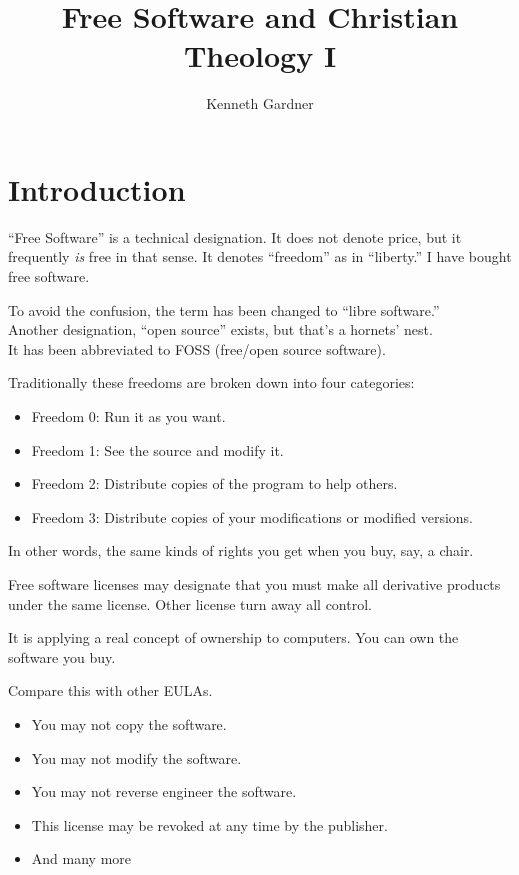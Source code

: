 \documentclass{beamer}
\title{Free Software and Christian Theology I}
\author{Kenneth Gardner}
\begin{document}
\maketitle

\section{Introduction}

\begin{frame}
  ``Free Software'' is a technical designation.
  It does not denote price, but it frequently \emph{is} free in that sense.
  It denotes ``freedom'' as in ``liberty.''
  I have bought free software.
\end{frame}

\begin{frame}
  To avoid the confusion, the term has been changed to ``libre software.''\\ \pause
  Another designation, ``open source'' exists, but that's a hornets' nest.\\ \pause
  It has been abbreviated to FOSS (free/open source software).
\end{frame}

\begin{frame}
  Traditionally these freedoms are broken down into four categories:\pause
  \begin{itemize}
	\item Freedom 0: Run it as you want.\pause
	\item Freedom 1: See the source and modify it.\pause
	\item Freedom 2: Distribute copies of the program to help others.\pause
	\item Freedom 3: Distribute copies of your modifications or modified versions.\pause
  \end{itemize}
  In other words, the same kinds of rights you get when you buy, say, a chair.
\end{frame}

\begin{frame}
  Free software licenses may designate that you must make all derivative products under the same license.
  Other license turn away all control.

  It is applying a real concept of ownership to computers.
  You can own the software you buy.
\end{frame}

\begin{frame}
  Compare this with other EULAs.\pause
  \begin{itemize}
	\item You may not copy the software.\pause
	\item You may not modify the software.\pause
	\item You may not reverse engineer the software.\pause
	\item This license may be revoked at any time by the publisher.\pause
	\item And many more
  \end{itemize}
\end{frame}
\end{document}
